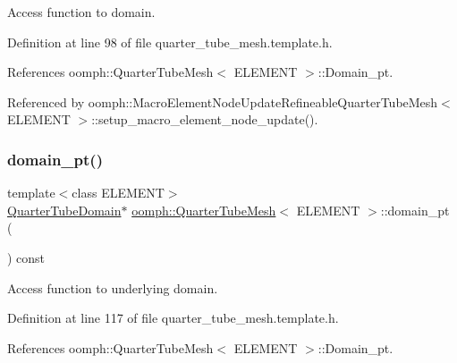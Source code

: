 Access function to domain. 



Definition at line 98 of file quarter\+\_\+tube\+\_\+mesh.\+template.\+h.



References oomph\+::\+Quarter\+Tube\+Mesh$<$ E\+L\+E\+M\+E\+N\+T $>$\+::\+Domain\+\_\+pt.



Referenced by oomph\+::\+Macro\+Element\+Node\+Update\+Refineable\+Quarter\+Tube\+Mesh$<$ E\+L\+E\+M\+E\+N\+T $>$\+::setup\+\_\+macro\+\_\+element\+\_\+node\+\_\+update().

\mbox{\label{classoomph_1_1QuarterTubeMesh_a351b2060f43c881d7bda9b7ef4a1c32e}} 
\subsubsection{\texorpdfstring{domain\+\_\+pt()}{domain\_pt()}\hspace{0.1cm}{\footnotesize\ttfamily [2/2]}}
{\footnotesize\ttfamily template$<$class E\+L\+E\+M\+E\+NT$>$ \\
\hyperlink{classoomph_1_1QuarterTubeDomain}{Quarter\+Tube\+Domain}$\ast$ \hyperlink{classoomph_1_1QuarterTubeMesh}{oomph\+::\+Quarter\+Tube\+Mesh}$<$ E\+L\+E\+M\+E\+NT $>$\+::domain\+\_\+pt (\begin{DoxyParamCaption}{ }\end{DoxyParamCaption}) const\hspace{0.3cm}{\ttfamily [inline]}}



Access function to underlying domain. 



Definition at line 117 of file quarter\+\_\+tube\+\_\+mesh.\+template.\+h.



References oomph\+::\+Quarter\+Tube\+Mesh$<$ E\+L\+E\+M\+E\+N\+T $>$\+::\+Domain\+\_\+pt.

\mbox{\label{classoomph_1_1QuarterTubeMesh_af59c4cde343ddd76caea4bc8c8ad8b94}} 
